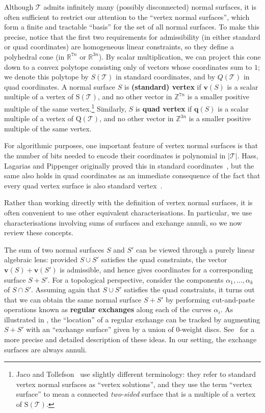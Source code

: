 \documentclass[a4paper,UKenglish,cleveref, autoref, thm-restate]{lipics-v2021}
\newcommand{\tri}{\mathcal{T}}
\begin{document}
Although $\tri$ admits infinitely many (possibly disconnected) normal surfaces, it is often sufficient to restrict our attention to
the ``vertex normal surfaces'', which form a finite and tractable ``basis'' for the set of all normal surfaces.
To make this precise, notice that the first two requirements for admissibility (in either standard or quad coordinates) are homogeneous linear constraints,
so they define a polyhedral cone (in $\mathbb{R}^{7n}$ or $\mathbb{R}^{3n}$).
By scalar multiplication, we can project this cone down to a convex polytope consisting only of vectors whose coordinates sum to $1$;
we denote this polytope by $S(\tri)$ in standard coordinates, and by $Q(\tri)$ in quad coordinates.
A normal surface $S$ is \textbf{(standard) vertex} if $\mathbf{v}(S)$ is a scalar multiple of a vertex of $\mathrm{S}(\tri)$,
and no other vector in $\mathbb{Z}^{7n}$ is a smaller positive multiple of the same vertex.\footnote{%
Jaco and Tollefson~\cite{jaco1995algorithms} use slightly different terminology:
they refer to standard vertex normal surfaces as ``vertex solutions'',
and they use the term ``vertex surface'' to mean a connected \emph{two-sided} surface that is a multiple of a vertex of $\mathrm{S}(\tri)$.}
Similarly, $S$ is \textbf{quad vertex} if $\mathbf{q}(S)$ is a scalar multiple of a vertex of $\mathrm{Q}(\tri)$,
and no other vector in $\mathbb{Z}^{3n}$ is a smaller positive multiple of the same vertex.

For algorithmic purposes, one important feature of vertex normal surfaces is that the number of bits needed to encode their coordinates is polynomial in $|\tri|$.
Hass, Lagarias and Pippenger originally proved this in standard coordinates~\cite[Lemma~6.1]{hass1999computational},
but the same also holds in quad coordinates as an immediate consequence of the fact that every quad vertex surface is also standard vertex~\cite[Lemma 4.5]{Burton09Converting}.

Rather than working directly with the definition of vertex normal surfaces, it is often convenient to use other equivalent characterisations.
In particular, we use characterisations involving sums of surfaces and exchange annuli, so we now review these concepts.

The sum of two normal surfaces $S$ and $S'$ can be viewed through a purely linear algebraic lens:
provided $S\cup S'$ satisfies the quad constraints, the vector $\mathbf{v}(S)+\mathbf{v}(S')$
is admissible, and hence gives coordinates for a corresponding surface $S+S'$.
For a topological perspective, consider the components $\alpha_1, \ldots, \alpha_k$ of $S\cap S'$.
Assuming again that $S\cup S'$ satisfies the quad constraints, it turns out that we can obtain the same normal surface $S+S'$ by
performing cut-and-paste operations known as \textbf{regular exchanges} along each of the curves $\alpha_i$.
As illustrated in , the ``location'' of a regular exchange can be tracked by augmenting
$S+S'$ with an ``exchange surface'' given by a union of $0$-weight discs.
See~\cite[Section~2]{jaco1995algorithms} for a more precise and detailed description of these ideas.
In our setting, the exchange surfaces are always annuli.
\end{document}
